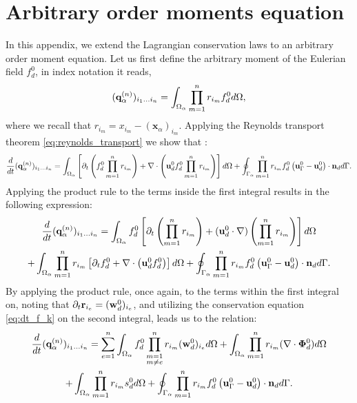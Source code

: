 
\section{Arbitrary order moments equation}
\label{ap:Moments_equations}
In this appendix, we extend the Lagrangian conservation laws to an arbitrary order moment equation. 
Let us first define the arbitrary moment of the Eulerian field $f_d^0$, in index notation it reads, 
\begin{equation*}
    (\textbf{q}_\alpha^{(n)})_{i_1\ldots i_n}
    = \int_{\Omega_{\alpha}} 
    \prod_{m=1}^{n} r_{i_m} f_d^0 
     d\Omega, 
\end{equation*}
where we recall that $r_{i_m} = x_{i_m} - (\textbf{x}_\alpha)_{i_m}$. 
Applying the Reynolds transport theorem \eqref{eq:reynolds_transport} we show that :
\begin{equation}
    \frac{d}{dt} {(\textbf{q}_\alpha^{(n)})_{i_1\ldots i_n}}
    =\int_{\Omega_{\alpha}} 
        \left[ \partial_t \left(f_d^0 \prod_{m=1}^{n} r_{i_m}\right) 
    + \mathbf{\nabla}\cdot \left(\textbf{u}_d^0 f_d^0 \prod_{m=1}^{n} r_{i_m}\right) \right]
     d\Omega
    +\oint_{\Gamma_{\alpha}}  \prod_{m=1}^{n} r_{i_m} f_d^0 \left(\textbf{u}_\Gamma^0 - \textbf{u}_d^0\right)\cdot \textbf{n}_d  d\Gamma. 
\end{equation}
Applying the product rule to the terms inside the first integral results in the following expression: 
\begin{multline}
    \frac{d}{dt} {(\textbf{q}_\alpha^{(n)})_{i_1\ldots i_n}}
    =\int_{\Omega_{\alpha}}  
        f_d^0 \left[ \partial_t \left(\prod_{m=1}^{n} r_{i_m}\right) 
        + (\textbf{u}_d^0\cdot \mathbf{\nabla}) \left( \prod_{m=1}^{n} r_{i_m}\right) \right]
     d\Omega\\
    +\int_{\Omega_{\alpha}}  
        \prod_{m=1}^{n} r_{i_m} 
        \left[ \partial_t f_d^0
    +  \mathbf{\nabla}\cdot \left(\textbf{u}_d^0 f_d^0 \right) \right]
     d\Omega
    +\oint_{\Gamma_{\alpha}}  \prod_{m=1}^{n} r_{i_m} f_d^0 \left(\textbf{u}_\Gamma^0 - \textbf{u}_d^0\right)\cdot \textbf{n}_d  d\Gamma. 
\end{multline}
By applying the product rule, once again, to the terms within the first integral on, noting that $\partial_t \textbf{r}_{i_e} = (\textbf{w}_d^0)_{i_e}$, and utilizing the conservation equation \ref{eq:dt_f_k} on the second integral, leads us to the relation: 
\begin{multline}
    \frac{d}{dt} {(\textbf{q}_\alpha^{(n)})_{i_1\ldots i_n}}
    = \sum_{e=1}^{n} \int_{\Omega_{\alpha}}  
        f_d^0 \prod^{n}_{\substack{ m=1 \\   m \neq e}} r_{i_m} (\textbf{w}_d^0)_{i_e}
         d\Omega
    +\int_{\Omega_{\alpha}} \prod_{m=1}^{n} r_{i_m} (\mathbf{\nabla}\cdot\bm{\Phi}_d^0) d\Omega\\
    + \int_{\Omega_{\alpha}}  \prod_{m=1}^{n} r_{i_m} s_d^0 d\Omega
    +\oint_{\Gamma_{\alpha}}  \prod_{m=1}^{n} r_{i_m} f_d^0 \left(\textbf{u}_\Gamma^0 - \textbf{u}_d^0\right)\cdot \textbf{n}_d  d\Gamma.
\end{multline}
